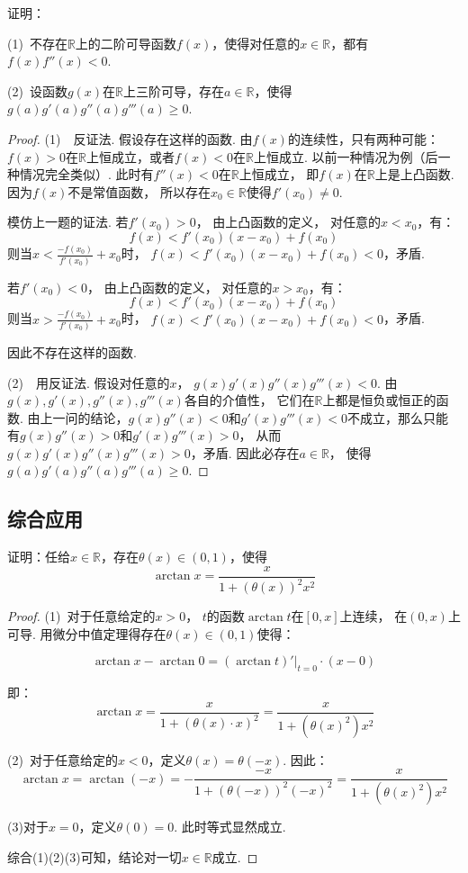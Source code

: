 \begin{example}
\label{ex:ch04-44}
证明：\par
(1)~不存在$\mathbb{R}$上的二阶可导函数$f(x)$，使得对任意的$x \in \mathbb{R}$，都有
$f(x)f''(x) < 0$.

(2)~设函数$g(x)$在$\mathbb{R}$上三阶可导，存在$a \in \mathbb{R}$，使得
$g(a)g'(a)g''(a)g'''(a) \ge 0$.
\end{example}

\begin{proof}
(1)~~反证法. 假设存在这样的函数.
由$f(x)$的连续性，只有两种可能：$f(x)>0$在$\mathbb{R}$上恒成立，或者$f(x)<0$在$\mathbb{R}$上恒成立.
以前一种情况为例（后一种情况完全类似）.
此时有$f''(x) < 0$在$\mathbb{R}$上恒成立，
即$f(x)$在$\mathbb{R}$上是上凸函数.
因为$f(x)$不是常值函数，
所以存在$x_0 \in \mathbb{R}$使得$f'(x_0) \ne 0$.

模仿上一题的证法.
若$f'(x_0)>0$，
由上凸函数的定义，
对任意的$x < x_0$，有：
$$
f(x) < f'(x_0) (x - x_0) + f(x_0)
$$
则当$x < \frac{-f(x_0)}{f'(x_0)} + x_0$时，
$f(x) < f'(x_0) (x - x_0) + f(x_0) < 0$，矛盾.

若$f'(x_0) < 0$，
由上凸函数的定义，
对任意的$x > x_0$，有：
$$
f(x) < f'(x_0) (x - x_0) + f(x_0)
$$
则当$x > \frac{-f(x_0)}{f'(x_0)} + x_0$时，
$f(x) < f'(x_0) (x - x_0) + f(x_0) < 0$，矛盾.

因此不存在这样的函数.

(2)~~用反证法.
假设对任意的$x$，
$g(x)g'(x)g''(x)g'''(x) < 0$.
由$g(x),g'(x),g''(x),g'''(x)$各自的介值性，
它们在$\mathbb{R}$上都是恒负或恒正的函数.
由上一问的结论，$g(x)g''(x)<0$和$g'(x)g'''(x)<0$不成立，那么只能有$g(x)g''(x)>0$和$g'(x)g'''(x)>0$，
从而$g(x)g'(x)g''(x)g'''(x) > 0$，矛盾.
因此必存在$a \in \mathbb{R}$，
使得$g(a)g'(a)g''(a)g'''(a) \ge 0$.
\end{proof}

\subsection{综合应用}

\begin{example}[2021]
\label{ex:ch04-45}
证明：任给$x \in \mathbb{R}$，存在$\theta(x) \in (0,1)$，使得
$$
\arctan x = \frac{x}{1 + (\theta(x))^2 x^2}
$$
\end{example}

\begin{proof}
(1)~对于任意给定的$x>0$，
$t$的函数$\arctan t$在$[0,x]$上连续，
在$(0,x)$上可导.
用微分中值定理得存在$\theta (x) \in (0,1)$使得：

$$
\arctan x - \arctan 0 = (\arctan t)' |_{t=0} \cdot (x-0)
$$

即：
$$
\arctan x = \frac{x}{1+(\theta (x) \cdot x)^2} = \frac{x}{1 + (\theta (x)^2) x^2}
$$

(2)~对于任意给定的$x<0$，定义$\theta (x) = \theta (-x)$. 因此：
$$
\arctan x = \arctan (-x) = -\frac{-x}{1 + (\theta (-x))^2(-x)^2} = \frac{x}{1 + (\theta (x)^2) x^2}
$$

(3)对于$x=0$，定义$\theta (0) =0$. 此时等式显然成立.

综合(1)(2)(3)可知，结论对一切$x \in \mathbb{R}$成立.
\end{proof}

